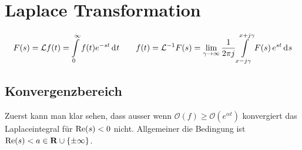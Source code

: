 \section{Laplace Transformation}
\[
  F(s) = \mathcal{L} f(t) = \int\limits_{0}^{\infty} f(t) e^{-st} \,\mathrm{d}^{} t
  \qquad
  f(t) = \mathcal{L}^{-1} F(s) = \lim_{\gamma\to\infty} \frac{1}{2\pi j} 
  	\int\limits_{x - j\gamma}^{x + j\gamma} F(s)\, e^{st} \,\mathrm{d}^{} s
\]
\subsection{Konvergenzbereich}
Zuerst kann man klar sehen, dass ausser wenn 
\(\mathcal{O}(f) \geq \mathcal{O}(e^{\alpha t})\)
konvergiert das Laplaceintegral f\"ur \(\operatorname{\mathrm{Re}}(s) < 0\) nicht.
Allgemeiner die Bedingung ist \(\operatorname{\mathrm{Re}}(s) < a \in \mathbf{R}\cup\{\pm\infty\}\).